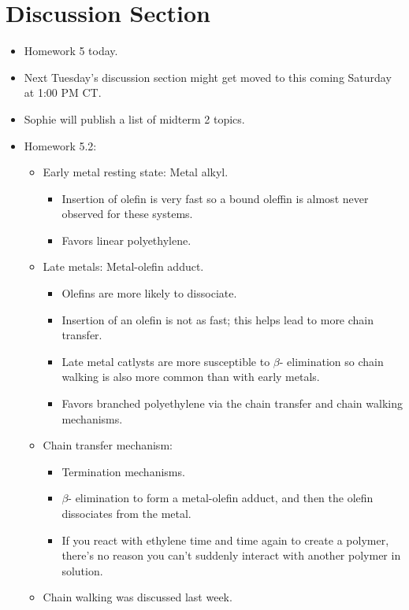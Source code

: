 \documentclass[../notes.tex]{subfiles}
\begin{document}
\section{Discussion Section}
\begin{itemize}
    \item {}Homework 5 today.
    \item Next Tuesday's discussion section might get moved to this coming Saturday at 1:00 PM CT.
    \item Sophie will publish a list of midterm 2 topics.
    \item Homework 5.2:
    \begin{itemize}
        \item Early metal resting state: Metal alkyl.
        \begin{itemize}
            \item Insertion of olefin is very fast so a bound oleffin is almost never observed for these systems.
            \item Favors linear polyethylene.
        \end{itemize}
        \item Late metals: Metal-olefin adduct.
        \begin{itemize}
            \item Olefins are more likely to dissociate.
            \item Insertion of an olefin is not as fast; this helps lead to more chain transfer.
            \item Late metal catlysts are more susceptible to $\beta$- elimination so chain walking is also more common than with early metals.
            \item Favors branched polyethylene via the chain transfer and chain walking mechanisms.
        \end{itemize}
        \item Chain transfer mechanism:
        \begin{itemize}
            \item Termination mechanisms.
            \item $\beta$- elimination to form a metal-olefin adduct, and then the olefin dissociates from the metal.
            \item If you react with ethylene time and time again to create a polymer, there's no reason you can't suddenly interact with another polymer in solution.
        \end{itemize}
        \item Chain walking was discussed last week.

\end{itemize}
\end{itemize}
\end{document}
